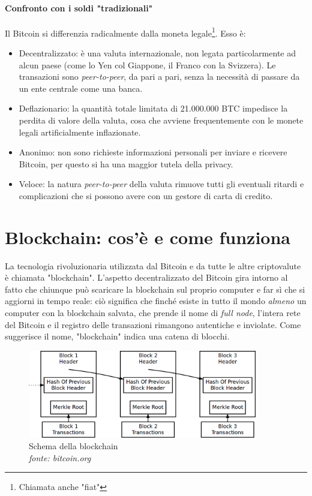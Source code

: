 \documentclass {article}
\begin{document}
\paragraph {Confronto con i soldi "tradizionali"}

Il Bitcoin si differenzia radicalmente dalla moneta legale\footnote{Chiamata anche "fiat"}.
Esso è:

\begin{itemize}
\item Decentralizzato: è una valuta internazionale, non legata particolarmente ad alcun paese (come lo Yen col Giappone, il Franco con la Svizzera). Le transazioni sono \textit{peer-to-peer}, da pari a pari, senza la necessità di passare da un ente centrale come una banca.
\item Deflazionario: la quantità totale limitata di 21.000.000 BTC impedisce la perdita di valore della valuta, cosa che avviene frequentemente con le monete legali artificialmente inflazionate.
\item Anonimo: non sono richieste informazioni personali per inviare e ricevere Bitcoin, per questo si ha una maggior tutela della privacy.
\item Veloce: la natura \textit{peer-to-peer} della valuta rimuove tutti gli eventuali ritardi e complicazioni che si possono avere con un gestore di carta di credito.
\end{itemize}


\newpage
\null
\newpage


\section {Blockchain: cos'è e come funziona}


La tecnologia rivoluzionaria utilizzata dal Bitcoin e da tutte le altre criptovalute è chiamata "blockchain".
L'aspetto decentralizzato del Bitcoin gira intorno al fatto che chiunque può scaricare la blockchain sul proprio computer e far sì che si aggiorni in tempo reale: ciò significa che finché esiste in tutto il mondo \emph{almeno} un computer con la blockchain salvata, che prende il nome di \textit{full node}, l'intera rete del Bitcoin e il registro delle transazioni rimangono autentiche e inviolate.
Come suggerisce il nome, "blockchain" indica una catena di blocchi.

\vspace {0.5cm}
\begin{figure}[htb!]
\includegraphics [width = 10cm] {blockchain2.png}
\centering
\caption {Schema della blockchain\\\textit{fonte: bitcoin.org}}
\end{figure}
\end{document}
